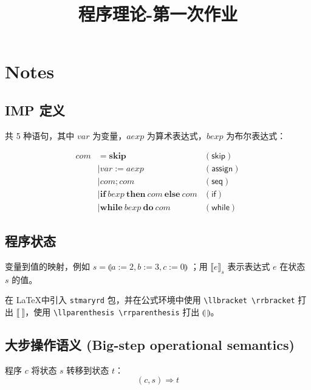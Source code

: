 \documentclass[UTF8]{ctexart}
\author{}
\date{}
\title{程序理论-第一次作业}
\begin{document}
    \maketitle

    \setlength{\abovedisplayskip}{0pt}
    \setlength{\belowdisplayskip}{0pt}

    \section*{Notes}

    \subsection*{IMP 定义}
    
    共 5 种语句，其中 $var$ 为变量，$aexp$ 为算术表达式，$bexp$ 为布尔表达式：\vspace{-1em}

    \begin{align*}
        com &= \mathbf{skip}    & (\mathsf{skip})   \\
            &\mid var := aexp   & (\mathsf{assign}) \\
            &\mid com; com      & (\mathsf{seq})    \\
            &\mid \mathbf{if}\ bexp\ \mathbf{then}\ com\ \mathbf{else}\ com  & (\mathsf{if}) \\
            &\mid \mathbf{while}\ bexp\ \mathbf{do}\ com & (\mathsf{while})
    \end{align*}

    \subsection*{程序状态}

    变量到值的映射，例如 $s=\llparenthesis a:=2, b:=3, c:=0 \rrparenthesis$ ；用 ${\llbracket e \rrbracket}_s$ 表示表达式 $e$ 在状态 $s$ 的值。

    在 \LaTeX 中引入 \texttt{stmaryrd} 包，并在公式环境中使用 \texttt{\textbackslash llbracket \textbackslash rrbracket} 打出 $\llbracket\ \rrbracket$，使用 \texttt{\textbackslash llparenthesis \textbackslash rrparenthesis} 打出 $\llparenthesis\ \rrparenthesis$。

    \subsection*{大步操作语义 (Big-step operational semantics)}

    程序 $c$ 将状态 $s$ 转移到状态 $t$：$$(c, s) \Rightarrow t$$
\end{document}
